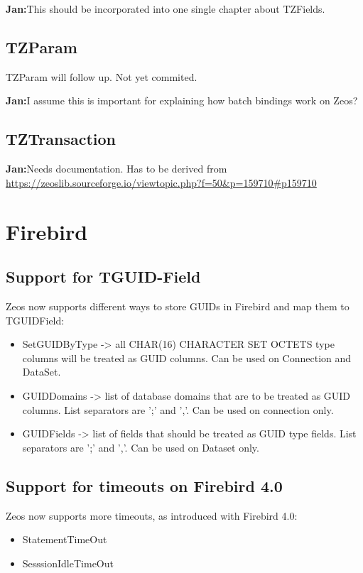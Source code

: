 \documentclass[a4paper,12pt,oneside]{article}
\begin{document}
\textbf{Jan:}This should be incorporated into one single chapter about TZFields.

\subsection{TZParam}

TZParam will follow up. 
Not yet commited.

\textbf{Jan:}I assume this is important for explaining how batch bindings work on Zeos?

\subsection{TZTransaction}

\textbf{Jan:}Needs documentation. Has to be derived from \url{https://zeoslib.sourceforge.io/viewtopic.php?f=50&p=159710#p159710}

\section{Firebird}

\subsection{Support for TGUID-Field}
Zeos now supports different ways to store GUIDs in Firebird and map them to TGUIDField:
\begin{itemize}
  \item SetGUIDByType -> all CHAR(16) CHARACTER SET OCTETS type columns will be treated as GUID columns. Can be used on Connection and DataSet.
  \item GUIDDomains -> list of database domains that are to be treated as GUID columns. List separators are ';' and ','. Can be used on connection only.
  \item GUIDFields -> list of fields that should be treated as GUID type fields. List separators are ';' and ','. Can be used on Dataset only.
\end{itemize}

\subsection{Support for timeouts on Firebird 4.0}
Zeos now supports more timeouts, as introduced with Firebird 4.0:
\begin{itemize}
  \item StatementTimeOut
  \item SesssionIdleTimeOut
\end{itemize}
\end{document}
